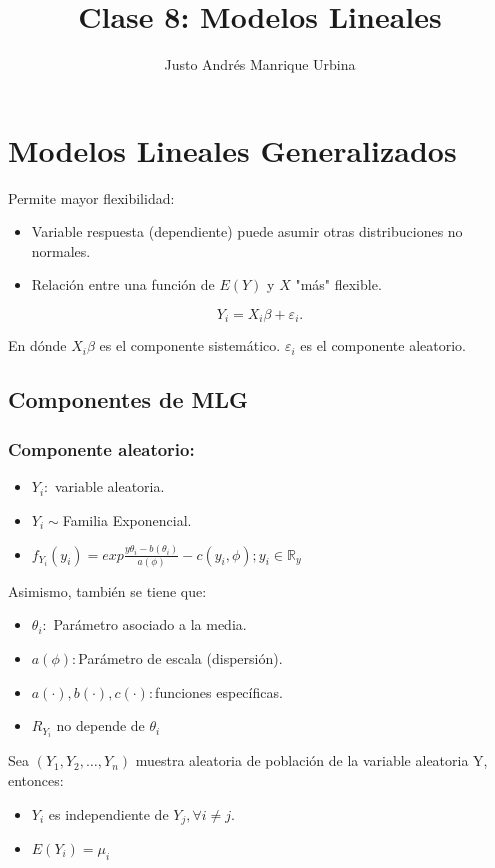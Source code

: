 \documentclass{article}
\title{Clase 8: Modelos Lineales}
\author{Justo Andrés Manrique Urbina}
\begin{document}
\maketitle
\section{Modelos Lineales Generalizados}
Permite mayor flexibilidad:
\begin{itemize}
	\item Variable respuesta (dependiente) puede asumir otras distribuciones no normales.
	\item Relación entre una función de $E{(Y)}$ y $X$ "más" flexible.
\end{itemize}

\[ Y_{i}=X_{i}\beta + \varepsilon_{i}.\]

En dónde $X_{i}\beta$ es el componente sistemático. $\varepsilon_{i}$ es el componente aleatorio.

\subsection{Componentes de MLG}
\subsubsection{Componente aleatorio:}
		\begin{itemize}
			\item $Y_{i}:$ variable aleatoria.
			\item $Y_{i} \sim $Familia Exponencial.
			\item $f_{Y_{i}}{(y_{i})}=exp{\frac{y\theta_{i}-b{(\theta_{i})}}{a{(\phi)}}-c{(y_{i},\phi)}}; y_{i} \in \mathbb{R}_{y}$
		\end{itemize}


Asimismo, también se tiene que:
\begin{itemize}
	\item $\theta_{i}:$ Parámetro asociado a la media.
	\item $a{(\phi)}: $Parámetro de escala (dispersión).
	\item $a(\cdot), b(\cdot), c(\cdot): $funciones específicas.
	\item $R_{Y_{i}}$ no depende de $\theta_{i}$
\end{itemize}

Sea $(Y_{1},Y_{2},\ldots,Y_{n})$ muestra aleatoria de población de la variable aleatoria Y, entonces:
\begin{itemize}
	\item $Y_{i}$ es independiente de $Y_{j}, \forall i \neq j$.
	\item $E{(Y_{i})}=\mu_{i}$
\end{itemize}
\end{document}

